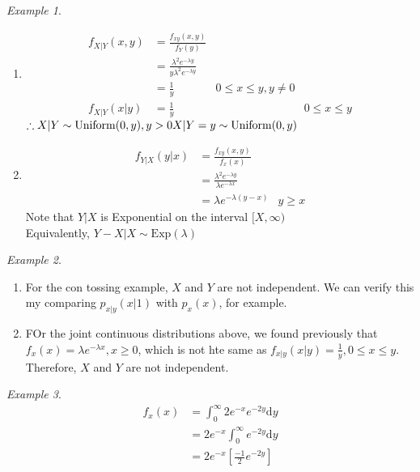 \documentclass{article}
\theoremstyle{definition}
\theoremstyle{remark}
\theoremstyle{example}
\newtheorem*{example}{Example}
\renewcommand{\d}{\mathrm{d}}
\begin{document}
	\begin{example}
		\begin{enumerate}
			\item \begin{align*}
			f_{X|Y}(x,y)&=\frac{f_{xy}(x,y)}{f_Y(y)}\\
			&=\frac{\lambda^2e^{-\lambda y}}{y \lambda^2e^{- \lambda y}}\\
			&=\frac{1}{y} & 0 \leq x \leq y, y \neq 0\\
			f_{X|Y}(x|y)&=\frac{1}{y}&&0 \leq x \leq y
			\end{align*}
			$\therefore X|Y \sim \mathrm{Uniform}(0,y), y > 0\\
			X|Y=y \sim \mathrm{Uniform}(0,y)$
			\item \begin{align*}
				f_{Y|X}(y|x)&=\frac{f_{xy}(x,y)}{f_x(x)}\\
				&=\frac{\lambda^2e^{-\lambda y}}{\lambda e^{-\lambda x}}\\
				&=\lambda e ^ {- \lambda(y-x)} & y \geq x
			\end{align*}
			Note that $Y|X$ is Exponential on the interval $[X, \infty)$\\
			Equivalently, $Y-X|X \sim \mathrm{Exp}(\lambda)$
		\end{enumerate}
	\end{example}
	\begin{example}
		\begin{enumerate}
			\item For the con tossing example, $X$ and $Y$ are not independent. We can verify this my comparing $p_{x|y}(x|1)$ with $p_x(x)$, for example.
			\item FOr the joint continuous distributions above, we found previously that $f_x(x)=\lambda e^{-\lambda x}, x \geq 0$, which is not hte same as $f_{x|y}(x|y)=\frac{1}{y}, 0 \leq x \leq y$.\\
			Therefore, $X$ and $Y$ are not independent.
		\end{enumerate}
	\end{example}
	\begin{example}
		\begin{align*}
			f_x(x) &= \int_{0}^{\infty}2 e^{-x}e^{-2y} \d y\\
			&= 2e^{-x} \int_{0}^{\infty} e^{-2y} \d y\\
			&= 2e^{-x} \left[\frac{-1}{2}e^{-2y}\right]
		\end{align*}
	\end{example}
\end{document}
